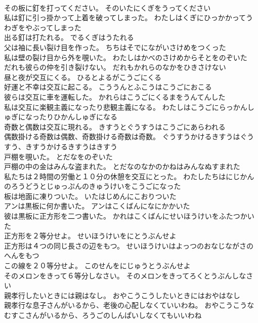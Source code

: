 \documentclass[8pt]{extreport}
\begin{document}
\begin{CJK}{UTF8}{min}
\\	その板に釘を打ってください。	そのいたにくぎをうってください 
\\	私は釘に引っ掛かって上着を破ってしまった。	わたしはくぎにひっかかってうわぎをやぶってしまった 
\\	出る釘は打たれる。	でるくぎはうたれる 
\\	父は袖に長い裂け目を作った。	ちちはそでにながいさけめをつくった 
\\	私は壁の裂け目から外を覗いた。	わたしはかべのさけめからそとをのぞいた 
\\	だれも彼らの仲を引き裂けない。	だれもかれらのなかをひきさけない 
\\	昼と夜が交互にくる。	ひるとよるがこうごにくる 
\\	好運と不幸は交互に起こる。	こううんとふこうはこうごにおこる 
\\	彼らは交互に車を運転した。	かれらはこうごにくるまをうんてんした 
\\	私は交互に楽観主義になったり悲観主義になる。	わたしはこうごにらっかんしゅぎになったりひかんしゅぎになる 
\\	奇数と偶数は交互に現れる。	きすうとぐうすうはこうごにあらわれる 
\\	偶数掛ける奇数は偶数、奇数掛ける奇数は奇数。	ぐうすうかけるきすうはぐうすう、きすうかけるきすうはきすう 
\\	戸棚を覗いた。	とだなをのぞいた 
\\	戸棚の中の金はみんな盗まれた。	とだなのなかのかねはみんなぬすまれた 
\\	私たちは２時間の労働と１０分の休憩を交互にとった。	わたしたちはにじかんのろうどうとじゅっぷんのきゅうけいをこうごになった 
\\	板は地面に凍りついた。	いたはじめんにこおりついた 
\\	アンは黒板に何か書いた。	アンはこくばんになにかかいた 
\\	彼は黒板に正方形を二つ書いた。	かれはこくばんにせいほうけいをふたつかいた 
\\	正方形を２等分せよ。	せいほうけいをにとうぶんせよ 
\\	正方形は４つの同じ長さの辺をもつ。	せいほうけいはよっつのおなじながさのへんをもつ 
\\	この線を２０等分せよ。	このせんをにじゅうとうぶんせよ 
\\	そのメロンをきって６等分しなさい。	そのメロンをきってろくとうぶんしなさい 
\\	親孝行したいときには親はなし。	おやこうこうしたいときにはおやはなし 
\\	親孝行な息子さんがいるから、老後の心配しなくていいわね。	おやこうこうなむすこさんがいるから、ろうごのしんぱいしなくてもいいわね 

\end{CJK}
\end{document}
